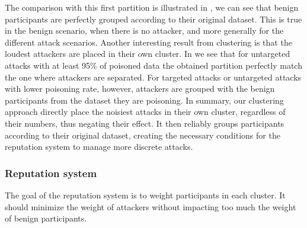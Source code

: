 The comparison with this first partition is illustrated in , we can see that benign participants are perfectly grouped according to their original dataset. 
This is true in the benign scenario, when there is no attacker, and more generally for the different attack scenarios. 
Another interesting result from clustering is that the loudest attackers are placed in their own cluster. 
In  we see that for untargeted attacks with at least 95\% of poisoned data the obtained partition perfectly match the one where attackers are separated. %
For targeted attacks or untargeted attacks with lower poisoning rate, however, attackers are grouped with the benign participants from the dataset they are poisoning. 
In summary, our clustering approach directly place the noisiest attacks in their own cluster, regardless of their numbers, thus negating their effect. 
It then reliably groups participants according to their original dataset, creating the necessary conditions for the reputation system to manage more discrete attacks. 


\subsubsection{Reputation system\label{sec:eval.results.reput}}
The goal of the reputation system is to weight participants in each cluster. 
It should minimize the weight of attackers without impacting too much the weight of benign participants. 

